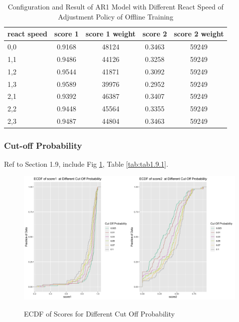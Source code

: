 \documentclass{article}
\begin{document}
\begin{table}[htbp]
  \begin{center}
    \caption{Configuration and Result of AR1 Model with Different React Speed of Adjustment Policy of Offline Training}
    \label{tab:tab1.8.1}
    \begin{tabular}{l|*{4}{c}}
      \textbf{react speed} & \textbf{score 1} & \textbf{score 1 weight} & \textbf{score 2} & \textbf{score 2 weight} \\
      \hline
      0,0 & 0.9168 & 48124 & 0.3463 & 59249\\
      1,1 & 0.9486 & 44126 & 0.3258 & 59249\\
      1,2 & 0.9544 & 41871 & 0.3092 & 59249\\
      1,3 & 0.9589 & 39976 & 0.2952 & 59249\\
      2,1 & 0.9392 & 46387 & 0.3407 & 59249\\
      2,2 & 0.9448 & 45564 & 0.3355 & 59249\\
      2,3 & 0.9487 & 44804 & 0.3463 & 59249\\
    \end{tabular}
  \end{center}
\end{table}


\subsubsection{Cut-off Probability}
Ref to Section 1.9, include Fig \ref{fig:fig1.9.1}, Table \ref{tab:tab1.9.1}.

\begin{figure}
    \caption{ECDF of Scores for Different Cut Off Probability}
    \centering
    \includegraphics{images/ECDFofscoresatDifferentCutOffProbabilityOfAR1,840,3,1.png}
    \label{fig:fig1.9.1}
\end{figure}
\end{document}
